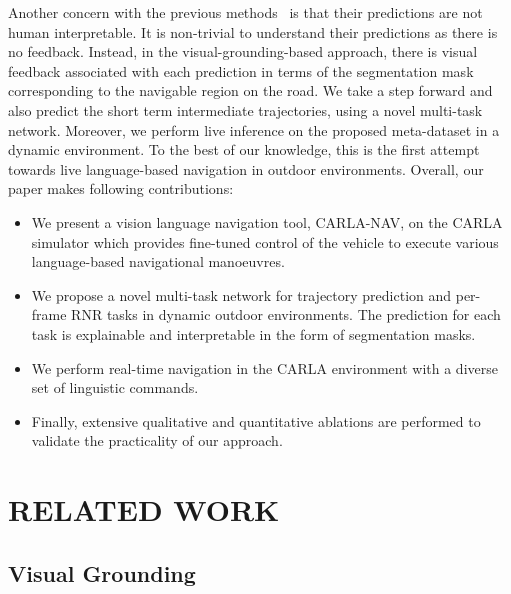 \documentclass[letterpaper, 10 pt, conference]{ieeeconf}  %
\begin{document}
Another concern with the previous methods~\cite{schumann-riezler-2022-analyzing,zhu-etal-2021-multimodal,anderson2018vision} is that their predictions are not human interpretable. It is non-trivial to understand their predictions as there is no feedback. Instead, in the visual-grounding-based approach, there is visual feedback associated with each prediction in terms of the segmentation mask corresponding to the navigable region on the road. We take a step forward and also predict the short term intermediate trajectories, using a novel multi-task network. Moreover, we perform live inference on the proposed meta-dataset in a dynamic environment. To the best of our knowledge, this is the first attempt towards live language-based navigation in outdoor environments. Overall, our paper makes following contributions:




\begin{itemize}
\item We present a vision language navigation tool, CARLA-NAV, on the CARLA simulator which provides fine-tuned control of the vehicle to execute various language-based navigational manoeuvres.
\item We propose a novel multi-task network for trajectory prediction and per-frame RNR tasks in dynamic outdoor environments. The prediction for each task is explainable and interpretable in the form of segmentation masks.
\item We perform real-time navigation in the CARLA environment with a diverse set of linguistic commands.
\item Finally, extensive qualitative and quantitative ablations are performed to validate the practicality of our approach.  

\end{itemize}

\section{RELATED WORK}
\subsection{Visual Grounding}
\end{document}
